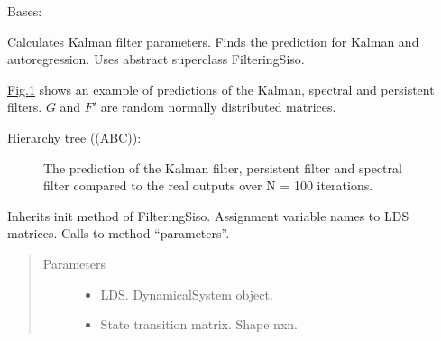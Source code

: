 \documentclass[letterpaper,10pt,english]{sphinxmanual}
\begin{document}
\begin{fulllineitems}
\label{\detokenize{LDS.LDS.filters:LDS.LDS.filters.kalman_filtering_siso.KalmanFilteringSISO}}
\sphinxAtStartPar
Bases: {\hyperref[\detokenize{LDS.LDS.filters:LDS.LDS.filters.filtering_siso.FilteringSiso}]{}}

\sphinxAtStartPar
Calculates Kalman filter parameters. Finds the prediction for Kalman and auto\sphinxhyphen{}regression.
Uses abstract superclass FilteringSiso.

\sphinxAtStartPar
\hyperref[\detokenize{LDS.LDS.filters:kalman}]{Fig.\@ \ref{\detokenize{LDS.LDS.filters:kalman}}} shows an example of predictions of the Kalman, spectral and persistent filters.
\(G\) and \(F'\) are random normally distributed matrices.

\sphinxAtStartPar
Hierarchy tree ((ABC)):

\noindent{}

\begin{figure}[htbp]
\centering
\capstart

\noindent{}
\caption{The prediction of the Kalman filter, persistent filter and spectral filter compared to the
real outputs over N = 100 iterations.}\label{\detokenize{LDS.LDS.filters:id1}}\label{\detokenize{LDS.LDS.filters:kalman}}\end{figure}

\sphinxAtStartPar
Inherits init method of FilteringSiso. Assignment variable names to LDS matrices.
Calls to method “parameters”.
\begin{quote}\begin{description}
\item[{Parameters}] \leavevmode\begin{itemize}
\item {} 
\sphinxAtStartPar
{} \textendash{} LDS. DynamicalSystem object.

\item {} 
\sphinxAtStartPar
{} \textendash{} State transition matrix. Shape nxn.


\end{itemize}
\end{description}
\end{quote}
\end{fulllineitems}
\end{document}
